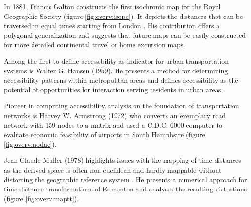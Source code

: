     In 1881, Francis Galton constructs the first isochronic map for the Royal
    Geographic Society (figure \ref{fig:overv:isopc}). It depicts the
    distances that can be traversed in equal times starting from London
    \cite{galton1881construction}. His contribution offers a polygonal
    generalization and suggests that future maps can be easily constructed for
    more detailed continental travel or home excursion maps.\par

    Among the first to define accessibility as indicator for urban
    transportation systems is Walter G. Hansen (1959). He presents a method for
    determining accessibility patterns within metropolitan areas and defines
    accessibility as the potential of opportunities for interaction serving
    residents in urban areas \cite{hansen1959accessibility}.\par


    Pioneer in computing accessibility analysis on the foundation of
    transportation networks is Harvey W. Armstrong (1972) who converts an
    exemplary road network with 159 nodes to a matrix and used a C.D.C. 6000
    computer to evaluate economic feasibility of airports in South Hamphsire
    \cite{armstrong1972network} (figure \ref{fig:overv:nodac}).\par

    Jean-Claude Muller (1978) highlights issues with the mapping of
    time-distances as the derived space is often non-euclidean and hardly
    mappable without distorting the geographic reference system
    \cite{muller1978mapping}. He presents a numerical approach for time-distance
    transformations of Edmonton and analyses the resulting distortions (figure
    \ref{fig:overv:maptt}).\par

